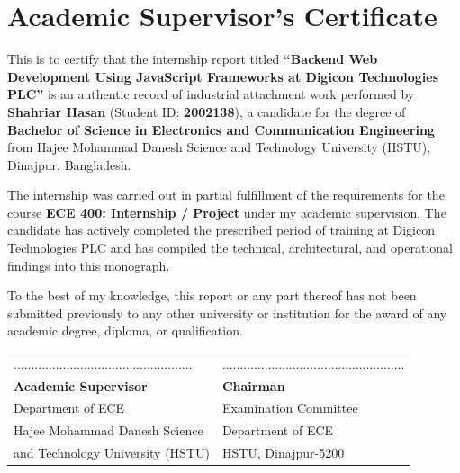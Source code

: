 \chapter*{Academic Supervisor's Certificate}

\vspace{0.6cm}
\noindent
This is to certify that the internship report titled \textbf{“Backend Web Development Using JavaScript Frameworks at Digicon Technologies PLC”} is an authentic record of industrial attachment work performed by \textbf{Shahriar Hasan} (Student ID: \textbf{2002138}), a candidate for the degree of \textbf{Bachelor of Science in Electronics and Communication Engineering} from Hajee Mohammad Danesh Science and Technology University (HSTU), Dinajpur, Bangladesh.

The internship was carried out in partial fulfillment of the requirements for the course \textbf{ECE 400: Internship / Project} under my academic supervision. The candidate has actively completed the prescribed period of training at Digicon Technologies PLC and has compiled the technical, architectural, and operational findings into this monograph.

To the best of my knowledge, this report or any part thereof has not been submitted previously to any other university or institution for the award of any academic degree, diploma, or qualification.

\vspace{2.5cm}
\begin{table}[h!]
\centering
\begin{tabularx}{\textwidth}{XX}
.................................................... & .................................................... \\
\textbf{Academic Supervisor} & \textbf{Chairman} \\
Department of ECE & Examination Committee \\
Hajee Mohammad Danesh Science & Department of ECE \\
and Technology University (HSTU) & HSTU, Dinajpur-5200 \\
\end{tabularx}
\end{table}
